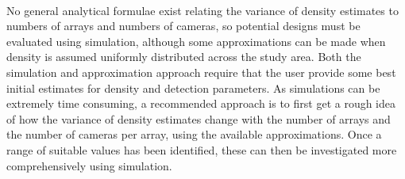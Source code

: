 \documentclass[a4paper,11pt]{article} %
\begin{document}
\\[1em]
No general analytical formulae exist relating the variance of density estimates to numbers of arrays and numbers of cameras, so potential designs must be evaluated using simulation, although some approximations can be made when density is assumed uniformly distributed across the study area. Both the simulation and approximation approach require that the user provide some best initial estimates for density and detection parameters. As simulations can be extremely time consuming, a recommended approach \citep{Efford2019} is to first get a rough idea of how the variance of density estimates change with the number of arrays and the number of cameras per array, using the available approximations. Once a range of suitable values has been identified, these can then be investigated more comprehensively using simulation. 
\end{document}
